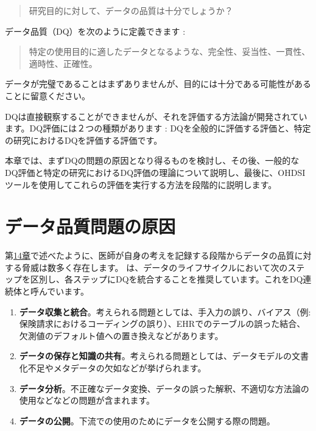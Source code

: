 \documentclass[
  11pt]{book}
\providecommand{\tightlist}{%
  \setlength{\itemsep}{0pt}\setlength{\parskip}{0pt}}
\theoremstyle{definition}
\theoremstyle{definition}
\theoremstyle{definition}
\theoremstyle{definition}
\theoremstyle{remark}
\begin{document}
\begin{quote}
研究目的に対して、データの品質は十分でしょうか？
\end{quote}

データ品質（DQ）を次のように定義できます \citep{roebuck_2012}: 

\begin{quote}
特定の使用目的に適したデータとなるような、完全性、妥当性、一貫性、適時性、正確性。
\end{quote}

データが完璧であることはまずありませんが、目的には十分である可能性があることに留意ください。

DQは直接観察することができませんが、それを評価する方法論が開発されています。DQ評価には２つの種類があります \citep{weiskopf_2013}: DQを全般的に評価する評価と、特定の研究におけるDQを評価する評価です。

本章では、まずDQの問題の原因となり得るものを検討し、その後、一般的なDQ評価と特定の研究におけるDQ評価の理論について説明し、最後に、OHDSIツールを使用してこれらの評価を実行する方法を段階的に説明します。

\section{データ品質問題の原因}\label{ux30c7ux30fcux30bfux54c1ux8ceaux554fux984cux306eux539fux56e0}

第\href{https://ohdsi.github.io/TheBookOfOhdsi/EvidenceQuality.html\#EvidenceQuality}{14章}で述べたように、医師が自身の考えを記録する段階からデータの品質に対する脅威は数多く存在します。\citet{dasu_2003} は、データのライフサイクルにおいて次のステップを区別し、各ステップにDQを統合することを推奨しています。これをDQ連続体と呼んでいます。

\begin{enumerate}
\def\labelenumi{\arabic{enumi}.}
\tightlist
\item
  \textbf{データ収集と統合}。考えられる問題としては、手入力の誤り、バイアス（例: 保険請求におけるコーディングの誤り）、EHRでのテーブルの誤った結合、欠測値のデフォルト値への置き換えなどがあります。
\item
  \textbf{データの保存と知識の共有}。考えられる問題としては、データモデルの文書化不足やメタデータの欠如などが挙げられます。
\item
  \textbf{データ分析}。不正確なデータ変換、データの誤った解釈、不適切な方法論の使用などなどの問題が含まれます。
\item
  \textbf{データの公開}。下流での使用のためにデータを公開する際の問題。
\end{enumerate}
\end{document}
